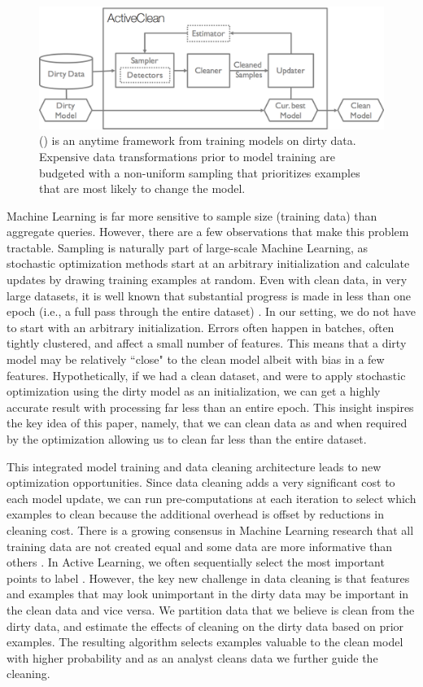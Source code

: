 \begin{figure}[t]
\centering
 \includegraphics[width=0.6\columnwidth]{figs/arch.png}
 \caption{\sysfull (\sys) is an anytime framework from training models on dirty data. Expensive data transformations prior to model training are budgeted with a non-uniform sampling that prioritizes examples that are most likely to change the model.  \label{sys-arch}}
\end{figure}

Machine Learning is far more sensitive to sample size (training data) than aggregate queries.
However, there are a few observations that make this problem tractable.
Sampling is naturally part of large-scale Machine Learning, as stochastic optimization methods start at an arbitrary initialization and calculate updates by drawing training examples at random. 
Even with clean data, in very large datasets, it is well known that substantial progress is made in less than one epoch (i.e., a full pass through the entire dataset) \cite{bottou2012stochastic}.
In our setting, we do not have to start with an arbitrary initialization.
Errors often happen in batches, often tightly clustered, and affect a small number of features.
This means that a dirty model may be relatively ``close" to the clean model albeit with bias in a few features.
Hypothetically, if we had a clean dataset, and were to apply stochastic optimization using the dirty model as an initialization, we can get a highly accurate result with processing far less than an entire epoch.
This insight inspires the key idea of this paper, namely, that we can clean data as and when required by the optimization allowing us to clean far less than the entire dataset.

This integrated model training and data cleaning architecture leads to new optimization opportunities.
Since data cleaning adds a very significant cost to each model update, we can run pre-computations at each iteration to select which examples to clean because the additional overhead is offset by reductions in cleaning cost.
There is a growing consensus in Machine Learning research that all training data are not created equal and some data are more informative than others \cite{drineas2012fast, settles2010active}.
In Active Learning, we often sequentially select the most important points to label \cite{settles2010active}.
However, the key new challenge in data cleaning is that features and examples that may look unimportant in the dirty data may be important in the clean data and vice versa.
We partition data that we believe is clean from the dirty data, and estimate the effects of cleaning on the dirty data based on prior examples.
The resulting algorithm selects examples valuable to the clean model with higher probability and as an analyst cleans data we further guide the cleaning.

